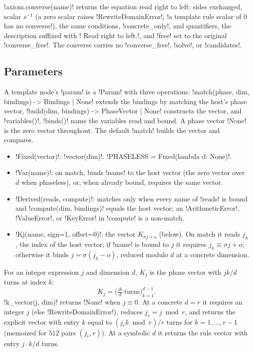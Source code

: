 \py!axiom.converse(name)! returns the equation read right to left: sides exchanged, scalar
$s^{-1}$ (a zero scalar raises \py!RewriteDomainError!, \code!a template rule scalar of 0 has no converse!),
the same conditions, \py!concrete_only!, and quantifiers, the description suffixed with
\code! Read right to left.!, and \py!free! set to the original \py!converse_free!. The converse
carries no \py!converse_free!, \py!solve!, or \py!candidates!.

\subsection{Parameters}

A template node's \py!param! is a \py!Param! with three operations:
\py!match(phase, dim, bindings) -> Bindings | None! extends the bindings by matching the host's
phase vector, \py!build(dim, bindings) -> PhaseVector | None! constructs the vector, and
\py!variables()!, \py!binds()! name the variables read and bound. A phase vector \py!None! is the
zero vector throughout. The default \py!match! builds the vector and compares.
\begin{itemize}
\item \py!Fixed(vector)!: \py!vector(dim)!. \py!PHASELESS = Fixed(lambda d: None)!.
\item \py!Var(name)!: on match, binds \py!name! to the host vector (the zero vector over $d$ when
  phaseless), or, when already bound, requires the same vector.
\item \py!Derived(reads, compute)!: matches only when every name of \py!reads! is bound and
  \py!compute(dim, bindings)! equals the host vector; an \py!ArithmeticError!, \py!ValueError!, or
  \py!KeyError! in \py!compute! is a non-match.
\item \py!Kj(name, sign=1, offset=0)!: the vector $K_{\sigma j+o}$ (below). On match it reads
  $j_h$, the index of the host vector; if \py!name! is bound to $j$ it requires
  $j_h \equiv \sigma j + o$; otherwise it binds $j = \sigma(j_h - o)$, reduced modulo $d$ at a
  concrete dimension.
\end{itemize}

\begin{definition}\label{def:rewriting-kj}
For an integer expression $j$ and dimension $d$, $K_j$ is the phase vector with
$jk/d$ turns at index $k$:
\[
  K_j = \bigl(\tfrac{jk}{d}\ \text{turns}\bigr)_{k=1}^{d-1} .
\]
\py!k_vector(j, dim)! returns \py!None! when $j \equiv 0$. At a concrete $d=r$ it requires an
integer $j$ (else \py!RewriteDomainError!), reduces $j_r = j \bmod r$, and returns the explicit
vector with entry $k$ equal to $(j_r k \bmod r)/r$ turns for $k = 1,\dots,r-1$ (memoized for $512$
pairs $(j_r, r)$). At a symbolic $d$ it returns the rule vector with entry $j\cdot k/d$ turns.
\end{definition}

